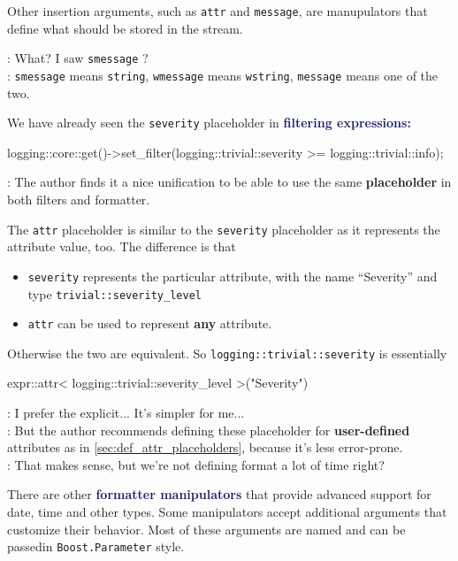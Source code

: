 \documentclass[dvipsnames]{article}
\newcommand{\mycola}{MidnightBlue}
\newcommand{\Cola}[1]{\textcolor{\mycola}{\textbf{#1}}}
\begin{document}
Other insertion arguments, such as \texttt{attr} and
\texttt{message}, are manupulators that define what should be stored in the
stream.

\begin{tcolorbox}
   : What? I saw \texttt{smessage} ?\\
   : \texttt{smessage} means \texttt{string}, \texttt{wmessage}
  means \texttt{wstring}, \texttt{message} means one of the two.
\end{tcolorbox}

We have already seen the \texttt{severity} placeholder in \Cola{filtering expressions:}
\begin{simplec}
  logging::core::get()->set_filter(logging::trivial::severity >= logging::trivial::info);
\end{simplec}
\begin{tcolorbox}
   : The author finds it a nice unification to be able to use the
  same \textbf{placeholder} in both filters and formatter.
\end{tcolorbox}

The \texttt{attr} placeholder is similar to the \texttt{severity} placeholder as
it represents the attribute value, too. The difference is that
\begin{itemize}
\item \texttt{severity} represents the particular attribute,
  with the name ``Severity'' and type \texttt{trivial::severity\_level}
\item \texttt{attr} can be used to represent \textbf{any} attribute.
\end{itemize}
Otherwise the two are equivalent. So \texttt{logging::trivial::severity} is
essentially
\begin{simplec}
  expr::attr< logging::trivial::severity_level >("Severity")
\end{simplec}

\begin{tcolorbox}
   : I prefer the explicit... It's simpler for me...\\
   : But the author recommends defining these placeholder for
  \textbf{user-defined} attributes as in \cref{sec:def_attr_placeholders},
  because it's less error-prone.\\
   : That makes sense, but we're not defining format a lot of
  time right?
\end{tcolorbox}

There are other \Cola{formatter manipulators} that provide advanced support for
date, time and other types. Some manipulators accept additional arguments that
customize their behavior. Most of these arguments are named and can be passedin
\texttt{Boost.Parameter} style.
\end{document}
